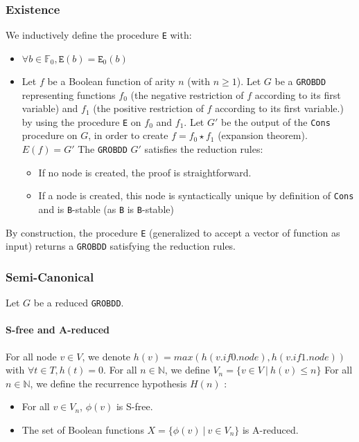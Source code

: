 \documentclass[a4paper,10pt]{article}
\newcommand{\N}{\mathbb{N}}%
\newcommand{\F}{\mathbb{F}}
\newcommand{\GroBdd}{\texttt{GROBDD}}
\begin{document}
\subsubsection{Existence}
We inductively define the procedure \texttt{E} with:\begin{itemize}
\item $\forall b\in\F_0, \texttt{E}(b) = \texttt{E}_0(b)$
\item
Let $f$ be a Boolean function of arity $n$ (with $n \geq 1$).
Let $G$ be a \GroBdd{} representing functions $f_0$ (the negative restriction of $f$ according to its first variable) and $f_1$ (the positive restriction of $f$ according to its first variable.) by using the procedure \texttt{E} on $f_0$ and $f_1$.
Let $G'$ be the output of the \texttt{Cons} procedure on $G$, in order to create $f = f_0 \star f_1$ (expansion theorem).\\
$E(f) = G'$
The \GroBdd{} $G'$ satisfies the reduction rules:\begin{itemize}
\item If no node is created, the proof is straightforward.
\item If a node is created, this node is syntactically unique by definition of \texttt{Cons} and is \texttt{B}-stable  (as \texttt{B} is \texttt{B}-stable)
\end{itemize}
\end{itemize}

By construction, the procedure \texttt{E} (generalized to accept a vector of function as input) returns a \GroBdd{} satisfying the reduction rules.

\subsubsection{Semi-Canonical}

Let $G$ be a reduced \GroBdd{}.

\paragraph{S-free and A-reduced}
For all node $v\in V$, we denote $h(v) = max(h(v.if0.node), h(v.if1.node))$ with $\forall t\in T, h(t) = 0$.
For all $n\in\N$, we define $V_n = \{v\in V ~|~ h(v) \leq n\}$
For all $n\in\N$, we define the recurrence hypothesis $H(n)$ :\begin{itemize}
\item For all $v\in V_n$, $\phi(v)$ is S-free.
\item The set of Boolean functions $X = \{\phi(v) ~|~ v\in V_n\}$ is A-reduced.
\end{itemize}
\end{document}
